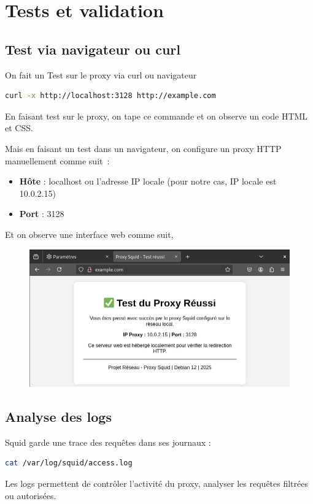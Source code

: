 \documentclass[12pt,a4paper]{article}
\begin{document}
\section{Tests et validation}
\subsection{Test via navigateur ou curl}
On fait un Test sur le proxy via curl ou navigateur
\begin{lstlisting}[language=bash]
curl -x http://localhost:3128 http://example.com
\end{lstlisting}
En faisant test sur le proxy, on tape ce commande et on observe un code HTML et CSS.

Mais en faisant un test dans un navigateur, on configure un proxy HTTP manuellement comme suit :

\begin{itemize}
    \item \textbf{Hôte} : localhost ou l'adresse IP locale (pour notre cas, IP locale est 10.0.2.15)
    \item \textbf{Port} : 3128
\end{itemize}
Et on observe une interface web comme suit,
\begin{figure}[H]
    \centering
    \includegraphics[width=1\linewidth]{img.png}
    
\end{figure}

\subsection{Analyse des logs}
Squid garde une trace des requêtes dans ses journaux :
\begin{lstlisting}[language=bash]
cat /var/log/squid/access.log
\end{lstlisting}
Les logs permettent de contrôler l'activité du proxy, analyser les requêtes filtrées ou autorisées.
\end{document}
